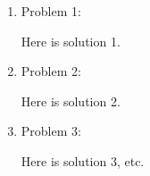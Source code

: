 \documentclass[11pt]{article}
\begin{document}
  \begin{enumerate}
    \item Problem 1:

    Here is solution 1.

    \pagebreak
    \item Problem 2:

    Here is solution 2.
    
    \pagebreak
    \item Problem 3:

    Here is solution 3, etc.
  \end{enumerate}
\end{document}
